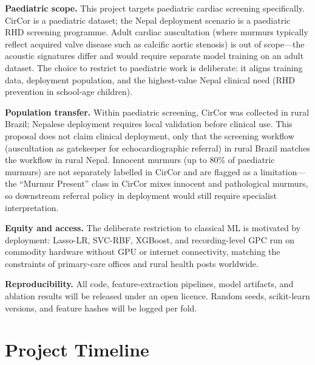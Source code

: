 \documentclass[10pt,twocolumn]{article}
\begin{document}
\textbf{Paediatric scope.} This project targets paediatric cardiac screening specifically. CirCor is a paediatric dataset; the Nepal deployment scenario is a paediatric RHD screening programme. Adult cardiac auscultation (where murmurs typically reflect acquired valve disease such as calcific aortic stenosis) is out of scope---the acoustic signatures differ and would require separate model training on an adult dataset. The choice to restrict to paediatric work is deliberate: it aligns training data, deployment population, and the highest-value Nepal clinical need (RHD prevention in school-age children).

\textbf{Population transfer.} Within paediatric screening, CirCor was collected in rural Brazil; Nepalese deployment requires local validation before clinical use. This proposal does not claim clinical deployment, only that the screening workflow (auscultation as gatekeeper for echocardiographic referral) in rural Brazil matches the workflow in rural Nepal. Innocent murmurs (up to 80\% of paediatric murmurs) are not separately labelled in CirCor and are flagged as a limitation---the ``Murmur Present'' class in CirCor mixes innocent and pathological murmurs, so downstream referral policy in deployment would still require specialist interpretation.

\textbf{Equity and access.} The deliberate restriction to classical ML is motivated by deployment: Lasso-LR, SVC-RBF, XGBoost, and recording-level GPC run on commodity hardware without GPU or internet connectivity, matching the constraints of primary-care offices and rural health posts worldwide.

\textbf{Reproducibility.} All code, feature-extraction pipelines, model artifacts, and ablation results will be released under an open licence. Random seeds, scikit-learn versions, and feature hashes will be logged per fold.

\section{Project Timeline}
\end{document}
